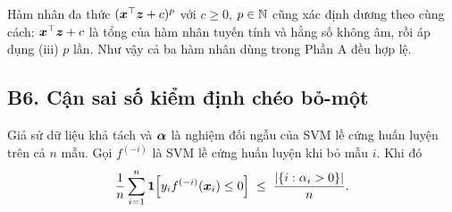\begin{remark}
Hàm nhân đa thức $(\bm{x}^{\top}\bm{z} + c)^p$ với $c \ge 0$, $p \in \mathbb{N}$ cũng xác định dương theo cùng cách:
$\bm{x}^{\top}\bm{z} + c$ là tổng của hàm nhân tuyến tính và hằng số không âm, rồi áp dụng (iii) $p$ lần.
Như vậy cả ba hàm nhân dùng trong Phần A đều hợp lệ.
\end{remark}

\subsection{B6. Cận sai số kiểm định chéo bỏ-một}\label{sec:B6}

\begin{theorem}\label{thm:B6-loo}
Giả sử dữ liệu khả tách và $\bm{\alpha}$ là nghiệm đối ngẫu của SVM lề cứng huấn luyện trên
cả $n$ mẫu. Gọi $f^{(-i)}$ là SVM lề cứng huấn luyện khi bỏ mẫu $i$. Khi đó
\[
  \frac{1}{n}\sum_{i=1}^n \mathbf{1}\!\left[y_i f^{(-i)}(\bm{x}_i) \le 0\right]
  \;\le\; \frac{\left\lvert \{i : \alpha_i > 0\} \right\rvert}{n}.
\]
\end{theorem}

